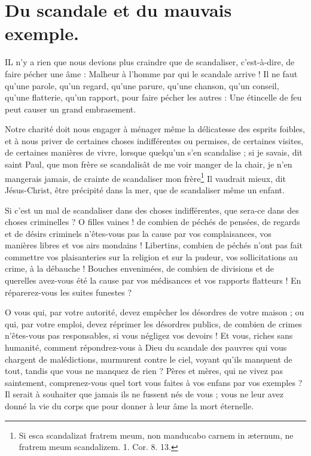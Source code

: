 \documentclass[instructions.tex]{subfiles}
\begin{document}
 
\chapter{Du scandale et du mauvais exemple.}
 
\primo IL n’y a rien que nous devions plus craindre que de scandaliser, c’est-à-dire, de faire pécher une âme : Malheur à l’homme par qui le scandale arrive ! Il ne faut qu’une parole, qu’un regard, qu’une parure, qu’une chanson, qu’un conseil, qu’une flatterie, qu’un rapport, pour faire pécher les autres : Une étincelle de feu peut causer un grand embrasement.
 
Notre charité doit nous engager à ménager même la délicatesse des esprits foibles, et à nous priver de certaines choses indifférentes ou permises, de certaines visites, de certaines manières de vivre, lorsque quelqu’un s’en scandalise ; si je savais, dit saint Paul, que mon frère se scandalisât de me voir manger de la chair, je n’en mangerais jamais, de crainte de scandaliser mon frère\footnote{Si esca scandalizat fratrem meum, non manducabo carnem in æternum, ne fratrem meum scandalizem. 1. Cor. 8. 13.} Il vaudrait mieux, dit Jésus-Christ, être précipité dans la mer, que de scandaliser même un enfant.
 
\secundo Si c’est un mal de scandaliser dans des choses indifférentes, que sera-ce dans des choses criminelles ? O filles vaines ! de combien de péchés de pensées, de regards et de désirs criminels n’êtes-vous pas la cause par vos complaisances, vos manières libres et vos airs mondains ! Libertins, combien de péchés n’ont pas fait commettre vos plaisanteries sur la religion et sur la pudeur, vos sollicitations au crime, à la débauche ! Bouches envenimées, de combien de divisions et de querelles avez-vous été la cause par vos médisances et vos rapports flatteurs ! En réparerez-vous les suites funestes ?
 
O vous qui, par votre autorité, devez empêcher les désordres de votre maison ; ou qui, par votre emploi, devez réprimer les désordres publics, de combien de crimes n’êtes-vous pas responsables, si vous négligez vos devoirs ! Et vous, riches sans humanité, comment répondrez-vous à Dieu du scandale des pauvres qui vous chargent de malédictions, murmurent contre le ciel, voyant qu’ils manquent de tout, tandis que vous ne manquez de rien ? Pères et mères, qui ne vivez pas saintement, comprenez-vous quel tort vous faites à vos enfans par vos exemples ? Il serait à souhaiter que jamais ils ne fussent nés de vous ; vous ne leur avez donné la vie du corps que pour donner à leur âme la mort éternelle.
 
\end{document}
